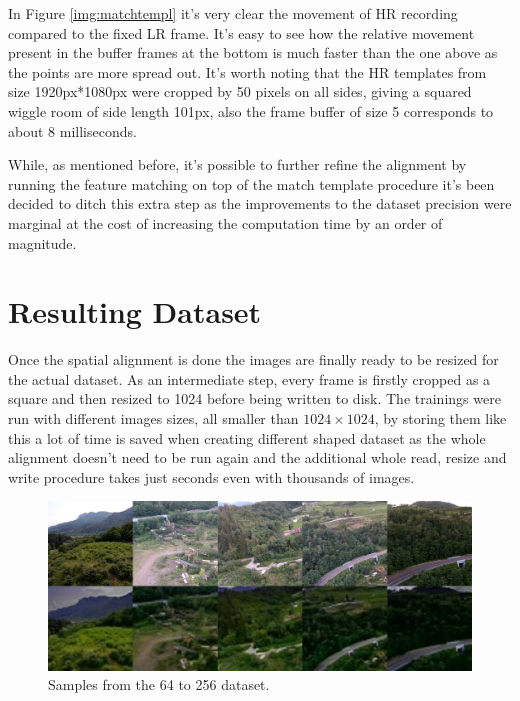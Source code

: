In Figure \ref{img:matchtempl} it's very clear the movement of HR recording compared to the fixed LR frame. It's easy to see how the relative movement present in the buffer frames at the bottom is much faster than the one above as the points are more spread out. It's worth noting that the HR templates from size 1920px*1080px were cropped by 50 pixels on all sides, giving a squared wiggle room of side length 101px, also the frame buffer of size 5 corresponds to about 8 milliseconds.

While, as mentioned before, it's possible to further refine the alignment by running the feature matching on top of the match template procedure it's been decided to ditch this extra step as the improvements to the dataset precision were marginal at the cost of increasing the computation time by an order of magnitude.

\section{Resulting Dataset}
\label{sec:final_dataset}

Once the spatial alignment is done the images are finally ready to be resized for the actual dataset. As an intermediate step, every frame is firstly cropped as a square and then resized to 1024 before being written to disk. The trainings were run with different images sizes, all smaller than  \(1024\times1024\), by storing them like this a lot of time is saved when creating different shaped dataset as the whole alignment doesn't need to be run again and the additional whole read, resize and write procedure takes just seconds even with thousands of images.


\begin{figure}[H]
  \centering
  \includegraphics[width=1\textwidth]{figures/final_64_256.png}
  \caption{Samples from the 64 to 256 dataset.}
  \label{img:64_256}
\end{figure}

